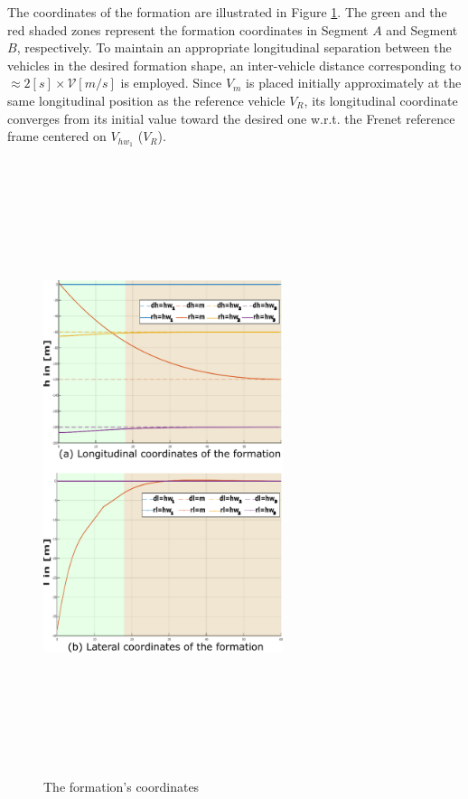  

The coordinates of the formation are illustrated in Figure \ref{fig:FRA-OCS:formation_coordinates}. The green and the red shaded zones represent the formation coordinates in Segment $A$ and Segment $B$, respectively. To maintain an appropriate longitudinal separation between the vehicles in the desired formation shape, an inter-vehicle distance corresponding to $\approx 2 [s] \times \mathcal{V} [m/s]$ is employed. Since $V_m$ is placed initially approximately at the same longitudinal position as the reference vehicle $V_R$, its longitudinal coordinate converges from its initial value toward the desired one w.r.t. the Frenet reference frame centered on $V_{hw_1}$ ($V_R$). 


        \begin{figure}[!h]
        \centering 
        \includegraphics[width=7cm,height=18cm,keepaspectratio]{chapters/Chapitre_5/Figures/FRA-OCS/Coordinates.pdf}
        \caption{The formation's coordinates}
        \label{fig:FRA-OCS:formation_coordinates}
        \end{figure}




